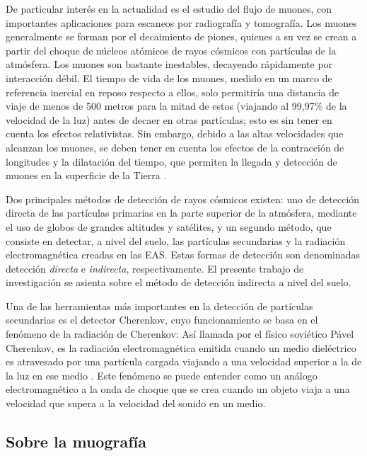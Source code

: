 \documentclass[12pt]{report}
\begin{document}
De particular interés en la actualidad es el estudio del flujo de muones, con importantes aplicaciones para escaneos por radiografía y tomografía. Los muones generalmente se forman por el decaimiento de piones, quienes a su vez se crean a partir del choque de núcleos atómicos de rayos cósmicos con partículas de la atmósfera. Los muones son bastante inestables, decayendo rápidamente por interacción débil. El tiempo de vida de los muones, medido en un marco de referencia inercial en reposo respecto a ellos, solo permitiría una distancia de viaje de menos de 500 metros para la mitad de estos (viajando al 99,97\% de la velocidad de la luz) antes de decaer en otras partículas; esto es sin tener en cuenta los efectos relativistas. Sin embargo, debido a las altas velocidades que alcanzan los muones, se deben tener en cuenta los efectos de la contracción de longitudes y la dilatación del tiempo, que permiten la llegada y detección de muones en la superficie de la Tierra \cite{cunningham2019high}.

Dos principales métodos de detección de rayos cósmicos existen: uno de detección directa de las partículas primarias en la parte superior de la atmósfera, mediante el uso de globos de grandes altitudes y satélites, y un segundo método, que consiste en detectar, a nivel del suelo, las partículas secundarias y la radiación electromagnética creadas en las EAS. Estas formas de detección son denominadas detección \textit{directa} e \textit{indirecta}, respectivamente. El presente trabajo de investigación se asienta sobre el método de detección indirecta a nivel del suelo.

Una de las herramientas más importantes en la detección de partículas secundarias es el detector Cherenkov, cuyo funcionamiento se basa en el fenómeno de la radiación de Cherenkov: Así llamada por el físico soviético Pável Cherenkov, es la radiación electromagnética emitida cuando un medio dieléctrico es atravesado por una partícula cargada viajando a una velocidad superior a la de la luz en ese medio \cite{jelley1955cerenkov}. Este fenómeno se puede entender como un análogo electromagnético a la onda de choque que se crea cuando un objeto viaja a una velocidad que supera a la velocidad del sonido en un medio.



\subsection*{Sobre la muografía}
\end{document}
